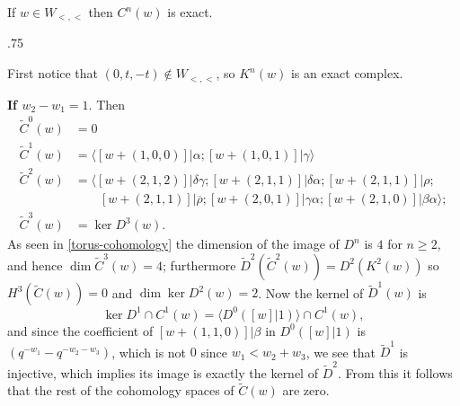 \documentclass[11pt,fleqn]{article}
\makeatletter
\renewenvironment{proof}[1][\proofname]{\par
  \pushQED{\qed}%
  \normalfont \topsep.75\paraskip\relax
  \trivlist
  \item[\hskip\labelsep
        \itshape
    #1\@addpunct{.}]\ignorespaces
}{%
  \popQED\endtrivlist\@endpefalse
}
\newcommand\orho{\overline\rho}
\makeatother
\begin{document}
\begin{Lemma}
If $w \in W_{<,<}$ then $C^n(w)$ is exact.
\end{Lemma}
\begin{proof}
First notice that $(0,t,-t) \notin W_{<,<}$, so $K^n(w)$ is an exact complex.

\textbf{If $w_2 - w_1 = 1$}. Then
\begin{align*}
\tilde C^{0}(w) 
  &= 0 \\
\tilde C^{1}(w) 
  &= \langle [w+(1,0,0)] | \alpha; [w+(1,0,1)] | \gamma \rangle \\
\tilde C^{2}(w)
  &= \langle  [w+(2,1,2)] |\delta\gamma;  [w+(2,1,1)]|\delta\alpha; [w+(2,1,1)]|\rho; \\
    &\qquad [w+(2,1,1)]|\orho; [w+(2,0,1)]|\gamma\alpha; [w+(2,1,0)]|\beta\alpha\rangle; 
    \\
\tilde C^3(w) 
  &= \ker D^3(w).
\end{align*}
As seen in \ref{torus-cohomology} the dimension of the image of $D^n$ is $4$ for $n 
\geq 2$, and hence $\dim \tilde C^3(w) = 4$; furthermore $\tilde D^2(\tilde C^2(w)) = 
D^2(K^2(w))$ so $H^3(\tilde C(w)) = 0$ and $\dim \ker D^2(w) = 2$. Now the kernel of 
$\tilde D^1(w)$ is 
\[
  \ker D^1 \cap C^1(w) = \langle D^0([w]|1)\rangle \cap C^1(w),
\]
and since the coefficient of $[w+(1,1,0)]|\beta$ in $ D^0([w]|1)$ is $(q^{-w_1} - 
q^{-w_2-w_3})$, which is not $0$ since $w_1 < w_2 + w_3$, we see that $\tilde D^1$ is 
injective, which implies its image is exactly the kernel of $\tilde D^2$. From this it 
follows that the rest of the cohomology spaces of $\tilde C(w)$ are zero.


\end{proof}
\end{document}
